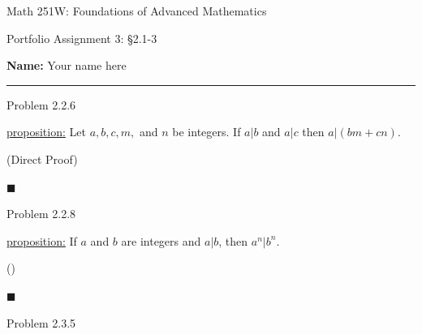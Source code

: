 \documentclass{article}
\theoremstyle{definition}
\begin{document}
	\begin{center}
		\Large{Math 251W: Foundations of Advanced Mathematics}

		\normalsize{Portfolio Assignment 3: \S 2.1-3}

		\vspace{0.2cm}

		\hfill {\bf Name:} Your name here

		\vspace{0.25cm}
		\hrule
	\end{center}

	\vspace{0.3cm}

	\noindent Problem 2.2.6  \vspace{0.3cm}


	\underline{proposition:} Let $a, b, c, m,$ and $n$ be integers. If
	$a|b$ and $a|c$ then $a|(bm+cn)$.

	\vspace{0.4cm}

	 (Direct Proof)

	\vspace{0.2cm}

	$\blacksquare$

	\vspace{1cm}




	\noindent Problem 2.2.8  \vspace{0.3cm}

	\underline{proposition:} If $a$ and $b$ are integers and $a|b$, then
	$a^n|b^n$.

	\vspace{0.4cm}

	 ()

	\vspace{0.2cm}

	$\blacksquare$

	\vspace{1cm}



	\noindent Problem 2.3.5  \vspace{0.3cm}
\end{document}
